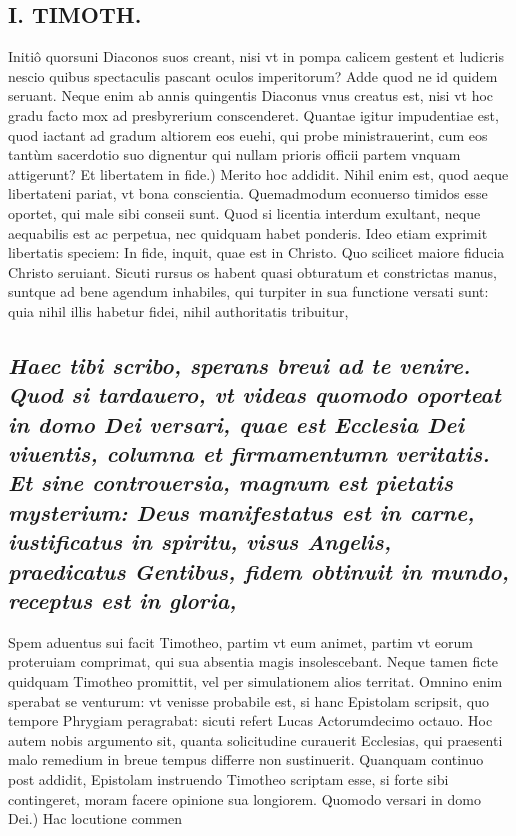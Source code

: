 \documentclass{article}
\begin{document}
\begin{pages}
\section*{I. TIMOTH. }
\marginpar{[ p.38 ]}\pstart Initiô quorsuni Diaconos suos creant, nisi vt in pompa calicem gestent et ludicris nescio quibus spectaculis pascant oculos imperitorum? Adde quod ne id quidem seruant. Neque enim ab annis quingentis Diaconus vnus creatus est, nisi vt hoc gradu facto mox ad presbyrerium conscenderet. Quantae igitur impudentiae est, quod iactant ad gradum altiorem eos euehi, qui probe ministrauerint, cum eos tantùm sacerdotio suo dignentur qui nullam prioris officii partem vnquam attigerunt?  \pend\pstart Et libertatem in fide.) Merito hoc addidit. Nihil enim est, quod aeque libertateni pariat, vt bona conscientia. Quemadmodum econuerso timidos esse oportet, qui male sibi conseii sunt. Quod si licentia interdum exultant, neque aequabilis est ac perpetua, nec quidquam habet ponderis. Ideo etiam exprimit libertatis speciem: In fide, inquit, quae est in Christo. Quo scilicet maiore fiducia Christo seruiant. Sicuti rursus os habent quasi obturatum et constrictas manus, suntque ad bene agendum inhabiles, qui turpiter in sua functione versati sunt: quia nihil illis habetur fidei, nihil authoritatis tribuitur,  \pend
{}
{}
\subsection*{\textit{Haec tibi scribo, sperans breui ad te venire. Quod si tardauero, vt videas quomodo oporteat in domo Dei versari, quae est Ecclesia Dei viuentis, columna et firmamentumn veritatis. Et sine controuersia, magnum est pietatis mysterium: Deus manifestatus est in carne, iustificatus in spiritu, visus Angelis, praedicatus Gentibus, fidem obtinuit in mundo, receptus est in gloria, }}\pstart Spem aduentus sui facit Timotheo, partim vt eum animet, partim vt eorum proteruiam comprimat, qui sua absentia magis insolescebant. Neque tamen ficte quidquam Timotheo promittit, vel per simulationem alios territat. Omnino enim sperabat se venturum: vt venisse probabile est, si hanc Epistolam scripsit, quo tempore Phrygiam peragrabat: sicuti refert Lucas Actorumdecimo octauo. Hoc autem nobis argumento sit, quanta solicitudine curauerit Ecclesias, qui praesenti malo remedium in breue tempus differre non sustinuerit. Quanquam continuo post addidit, Epistolam instruendo Timotheo scriptam esse, si forte sibi contingeret, moram facere opinione sua longiorem.  \pend\pstart Quomodo versari in domo Dei.) Hac locutione commen  \pend

\end{pages}
\end{document}
